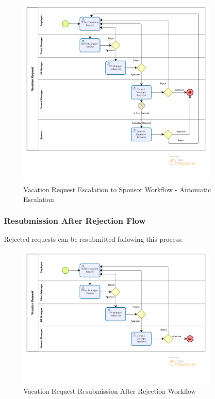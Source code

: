 \documentclass[12pt,a4paper]{article}
\begin{document}
\begin{figure}[H]
\centering
\includegraphics[width=0.9\textwidth]{Diagrams/Workflows/Vacation-Request-Escalation-to-Sponsor/Vacation-Request-Escalation-to-Sponsor.png}
\caption{Vacation Request Escalation to Sponsor Workflow - Automatic Escalation}
\label{fig:escalation-flow-app}
\end{figure}



\subsubsection{Resubmission After Rejection Flow}
Rejected requests can be resubmitted following this process:

\begin{figure}[H]
\centering
\includegraphics[width=0.9\textwidth]{Diagrams/Workflows/Vacation-Request-Resubmission-After-Rejection/Vacation-Request-Resubmission-After-Rejection.png}
\caption{Vacation Request Resubmission After Rejection Workflow}
\label{fig:resubmission-flow-app}
\end{figure}
\end{document}
